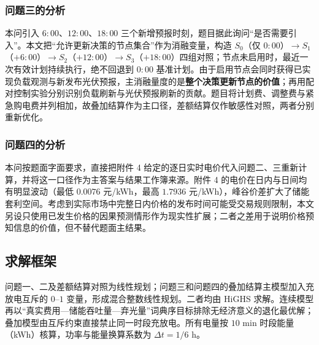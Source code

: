 \subsubsection*{问题三的分析}

本问引入 $6{:}00$、$12{:}00$、$18{:}00$ 三个新增预报时刻，题目据此询问“是否需要引入”。本文把“允许更新决策的节点集合”作为消融变量，构造 $S_0$（仅 $0{:}00$）$\to S_1$（$+6{:}00$）$\to S_2$（$+12{:}00$）$\to S_3$（$+18{:}00$）四组对照；节点未启用时，最近一次有效计划持续执行，绝不回退到 $0{:}00$ 基准计划。由于启用节点会同时获得已实现负载观测与新发布光伏预报，主消融量度的是\textbf{整个决策更新节点的价值}；再用配对控制实验分别识别负载刷新与光伏预报刷新的贡献。题目将计划费、调整费与紧急购电费并列相加，故叠加结算作为主口径，差额结算仅作敏感性对照，两者分别重新优化。

\subsubsection*{问题四的分析}

本问按题面字面要求，直接把附件 4 给定的逐日实时电价代入问题二、三重新计算，并将这一口径作为主答案与结果工作簿来源。附件 4 的电价在日内与日间均有明显波动（最低 $0.0076$ 元/kWh，最高 $1.7936$ 元/kWh），峰谷价差扩大了储能套利空间。考虑到实际市场中完整日内价格的发布时间可能受交易规则限制，本文另设只使用已发生价格的因果预测情形作为现实性扩展；二者之差用于说明价格预知信息的价值，但不替代题面主结果。

\subsection{求解框架}

问题一、二及差额结算对照为线性规划；问题三和问题四的叠加结算主模型加入充放电互斥的 $0$--$1$ 变量，形成混合整数线性规划。二者均由 HiGHS 求解。连续模型再以“真实费用—储能吞吐量—弃光量”词典序目标排除无经济意义的退化最优解；叠加模型由互斥约束直接禁止同一时段充放电。所有电量按 $10$ min 时段能量（kWh）核算，功率与能量换算系数为 $\Delta t=1/6$ h。
